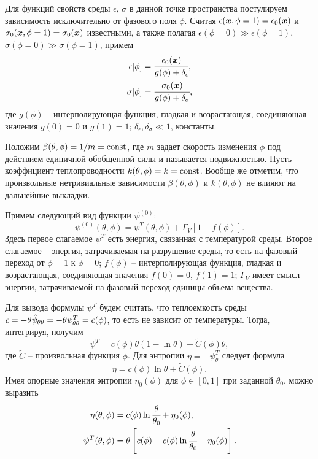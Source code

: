 Для функций свойств среды $\epsilon$, $\sigma$ в данной точке пространства постулируем зависимость исключительно от фазового поля $\phi$. Считая $\epsilon({\boldsymbol{x}}, \phi = 1) = \epsilon_0({\boldsymbol{x}})$ и $\sigma_0({\boldsymbol{x}}, \phi = 1) = \sigma_0({\boldsymbol{x}})$ известными, а также полагая $\epsilon(\phi = 0) \gg \epsilon(\phi = 1)$, $\sigma(\phi = 0) \gg \sigma(\phi = 1)$, примем
\begin{subequations}
\begin{align}
    \epsilon[\phi] &= \cfrac{\epsilon_0({\boldsymbol{x}})}{g(\phi) + \delta_\epsilon}, \\
    \sigma[\phi] &= \cfrac{\sigma_0({\boldsymbol{x}})}{g(\phi) + \delta_\sigma},
\end{align}
\label{eq:electrical_properties}
\end{subequations}
где $g(\phi)$ -- интерполирующая функция, гладкая и возрастающая, соединяющая значения $g(0) = 0$ и $g(1) = 1$; $\delta_\epsilon, \delta_\sigma \ll 1$, константы.

Положим $\beta(\theta, \phi) = 1 / m = \operatorname{{const}}$, где $m$ задает скорость изменения $\phi$ под действием единичной обобщенной силы и называется подвижностью. Пусть коэффициент теплопроводности $k(\theta, \phi) = k = \operatorname{{const}}$. Вообще же отметим, что произвольные нетривиальные зависимости $\beta(\theta, \phi)$ и $k(\theta, \phi)$ не влияют на дальнейшие выкладки.

Примем следующий вид функции $\psi^{(0)}$:
\[
    \psi^{(0)}(\theta, \phi) = \psi^T(\theta, \phi) + \Gamma_V [1 - f(\phi)].
\]
Здесь первое слагаемое $\psi^T$ есть энергия, связанная с температурой среды. Второе слагаемое -- энергия, затрачиваемая на разрушение среды, то есть на фазовый переход от $\phi = 1$ к $\phi = 0$; $f(\phi)$ -- интерполирующая функция, гладкая и возрастающая, соединяющая значения $f(0) = 0$, $f(1) = 1$; $\Gamma_V$ имеет смысл энергии, затрачиваемой на фазовый переход единицы объема вещества.

Для вывода формулы $\psi^T$ будем считать, что теплоемкость среды $c = -\theta \hat{\psi}_{\theta \theta} = -\theta \psi^T_{\theta \theta} \hm = c(\phi)$, то есть не зависит от температуры. Тогда, интегрируя, получим
\[
    \psi^T = c(\phi) \theta (1 - \ln \theta) - \widetilde{C}(\phi) \theta,
\]
где $\widetilde{C}$ -- произвольная функция $\phi$. Для энтропии $\eta = -\psi^T_\theta$ следует формула
\[
    \eta = c(\phi) \ln \theta + \widetilde{C}(\phi).
\]
Имея опорные значения энтропии $\eta_0(\phi)$ для $\phi \in [0, 1]$ при заданной $\theta_0$, можно выразить
\begin{subequations}
\begin{align}
    \eta(\theta, \phi) &= c(\phi) \ln \cfrac{\theta}{\theta_0} + \eta_0(\phi), \\
    \psi^T(\theta, \phi) &= \theta \left[ c(\phi) - c(\phi) \ln \cfrac{\theta}{\theta_0} - \eta_0(\phi) \right].
\end{align}
\label{eq:entropy_thermal_free_energy}
\end{subequations}

